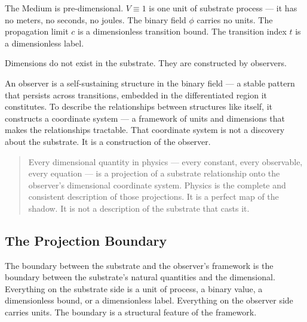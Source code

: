 \documentclass[12pt, letterpaper]{article}
\begin{document}
The Medium is pre-dimensional. \(V \equiv 1\) is one unit of substrate process
--- it has no meters, no seconds, no joules. The binary field \(\phi\) carries
no units. The propagation limit \(c\) is a dimensionless transition bound. The
transition index \(t\) is a dimensionless label.

Dimensions do not exist in the substrate. They are constructed by observers.

An observer is a self-sustaining structure in the binary field --- a stable
pattern that persists across transitions, embedded in the differentiated region
it constitutes. To describe the relationships between structures like itself, it
constructs a coordinate system --- a framework of units and dimensions that makes
the relationships tractable. That coordinate system is not a discovery about the
substrate. It is a construction of the observer.

\begin{quote}
Every dimensional quantity in physics --- every constant, every observable, every
equation --- is a projection of a substrate relationship onto the observer's
dimensional coordinate system. Physics is the complete and consistent description
of those projections. It is a perfect map of the shadow. It is not a description
of the substrate that casts it.
\end{quote}
\subsection{The Projection Boundary}
\label{sec:org380395f}

The boundary between the substrate and the observer's framework is the boundary
between the substrate's natural quantities and the dimensional. Everything on the
substrate side is a unit of process, a binary value, a dimensionless bound, or a
dimensionless label. Everything on the observer side carries units. The boundary
is a structural feature of the framework.
\end{document}
